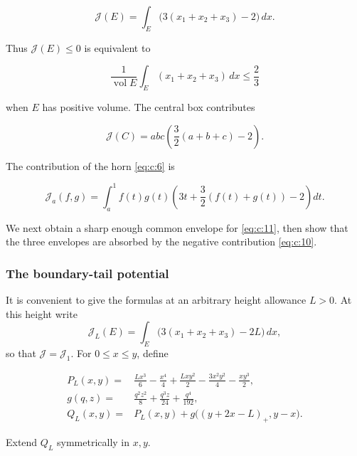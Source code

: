 \begin{equation}
\mathcal J(E)=\int_E\bigl(3(x_1+x_2+x_3)-2\bigr)\,dx.
\label{eq:c:8}
\end{equation}

Thus \(\mathcal J(E)\le0\) is equivalent to

\begin{equation}
\frac1{\operatorname{vol}E}
\int_E(x_1+x_2+x_3)\,dx\le\frac23
\label{eq:c:9}
\end{equation}

when \(E\) has positive volume. The central box contributes

\begin{equation}
\mathcal J(C)
=abc\left(\frac32(a+b+c)-2\right).
\label{eq:c:10}
\end{equation}

The contribution of the horn \eqref{eq:c:6} is

\begin{equation}
\mathcal J_a(f,g)
=\int_a^1 f(t)g(t)
 \left(3t+\frac32(f(t)+g(t))-2\right)dt.
\label{eq:c:11}
\end{equation}

We next obtain a sharp enough common envelope for \eqref{eq:c:11}, then show that the
three envelopes are absorbed by the negative contribution \eqref{eq:c:10}.

\subsubsection{The boundary-tail potential}

It is convenient to give the formulas at an arbitrary height allowance
\(L>0\). At this height write
\[
\mathcal J_L(E)=\int_E\bigl(3(x_1+x_2+x_3)-2L\bigr)\,dx,
\]
so that \(\mathcal J=\mathcal J_1\). For \(0\le x\le y\), define

\begin{equation}
\begin{aligned}
P_L(x,y)={}&\frac{Lx^3}{6}-\frac{x^4}{4}
 +\frac{Lxy^2}{2}-\frac{3x^2y^2}{4}-\frac{xy^3}{2},\\
g(q,z)={}&\frac{q^2z^2}{8}+\frac{q^3z}{24}+\frac{q^4}{192},\\
Q_L(x,y)={}&P_L(x,y)
 +g\bigl((y+2x-L)_+,y-x\bigr).
\end{aligned}
\label{eq:c:12}
\end{equation}

Extend \(Q_L\) symmetrically in \(x,y\).

